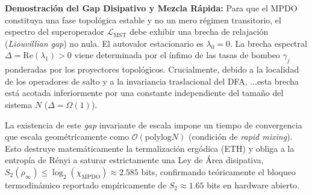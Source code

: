 \documentclass[12pt,a4paper]{article}
\theoremstyle{plain}
\theoremstyle{definition}
\theoremstyle{remark}
\begin{document}
\textbf{Demostración del Gap Disipativo y Mezcla Rápida:}
Para que el MPDO constituya una fase topológica estable y no un mero régimen transitorio, el espectro del superoperador $\mathcal{L}_{\text{MST}}$ debe exhibir una brecha de relajación (\textit{Liouvillian gap}) no nula. El autovalor estacionario es $\lambda_0 = 0$. La brecha espectral $\Delta = \text{Re}(\lambda_1) > 0$ viene determinada por el ínfimo de las tasas de bombeo $\gamma_j$ ponderadas por los proyectores topológicos. Crucialmente, debido a la localidad de los operadores de salto y a la invariancia traslacional del DFA, ...esta brecha está acotada inferiormente por una constante independiente del tamaño del sistema $N$ ($\Delta = \Omega(1)$).

La existencia de este \textit{gap} invariante de escala impone un tiempo de convergencia que escala geométricamente como $\mathcal{O}(\text{polylog} N)$ (condición de \textit{rapid mixing}). Esto destruye matemáticamente la termalización ergódica (ETH) y obliga a la entropía de Rényi a saturar estrictamente una Ley de Área disipativa, $S_2(\rho_\infty) \le \log_2(\chi_{\text{MPDO}}) \approx 2.585$ bits, confirmando teóricamente el bloqueo termodinámico reportado empíricamente de $S_2 \approx 1.65$ bits en hardware abierto.
\end{document}
